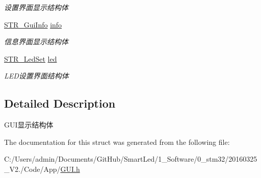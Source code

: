 \begin{DoxyCompactItemize}
\begin{DoxyCompactList}\small\item\em 设置界面显示结构体 \end{DoxyCompactList}\item 
\hypertarget{struct_s_t_r___gui_a737bf82538d58b10a511a2966c388b19}{\hyperlink{struct_s_t_r___gui_info}{\-S\-T\-R\-\_\-\-Gui\-Info} \hyperlink{struct_s_t_r___gui_a737bf82538d58b10a511a2966c388b19}{info}}\label{struct_s_t_r___gui_a737bf82538d58b10a511a2966c388b19}

\begin{DoxyCompactList}\small\item\em 信息界面显示结构体 \end{DoxyCompactList}\item 
\hypertarget{struct_s_t_r___gui_affea732ed8b60757268a14b42c67c339}{\hyperlink{struct_s_t_r___led_set}{\-S\-T\-R\-\_\-\-Led\-Set} \hyperlink{struct_s_t_r___gui_affea732ed8b60757268a14b42c67c339}{led}}\label{struct_s_t_r___gui_affea732ed8b60757268a14b42c67c339}

\begin{DoxyCompactList}\small\item\em \-L\-E\-D设置界面结构体 \end{DoxyCompactList}\end{DoxyCompactItemize}


\subsection{\-Detailed \-Description}
\-G\-U\-I显示结构体 

\-The documentation for this struct was generated from the following file\-:\begin{DoxyCompactItemize}
\item 
\-C\-:/\-Users/admin/\-Documents/\-Git\-Hub/\-Smart\-Led/1\-\_\-\-Software/0\-\_\-stm32/20160325\-\_\-\-V2./\-Code/\-App/\hyperlink{_g_u_i_8h}{\-G\-U\-I.\-h}\end{DoxyCompactItemize}
